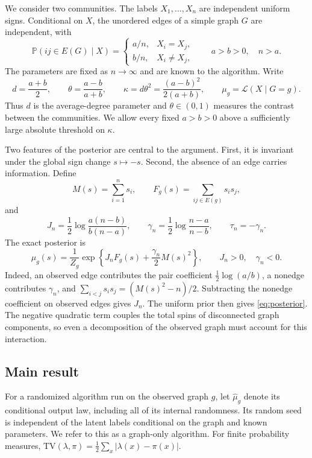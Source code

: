 \documentclass[11pt]{article}
\newcommand{\TV}{\mathrm{TV}}
\def\P{\mathbb{P}}
\numberwithin{equation}{section}
\begin{document}
We consider two communities. The labels $X_1,\ldots,X_n$ are independent uniform signs. Conditional on $X$, the unordered edges of a simple graph $G$ are independent, with
\[
 \P(ij\in E(G)\mid X)=
 \begin{cases}
 a/n,&X_i=X_j,\\
 b/n,&X_i\ne X_j,
 \end{cases}
 \qquad a>b>0,\quad n>a.
\]
The parameters are fixed as $n\to\infty$ and are known to the algorithm. Write
\[
 d=\frac{a+b}{2},\qquad
 \theta=\frac{a-b}{a+b},\qquad
 \kappa=d\theta^2=\frac{(a-b)^2}{2(a+b)},
 \qquad \mu_g=\mathcal L(X\mid G=g).
\]
Thus $d$ is the average-degree parameter and $\theta\in(0,1)$ measures the contrast between the communities. We allow every fixed $a>b>0$ above a sufficiently large absolute threshold on $\kappa$.

Two features of the posterior are central to the argument. First, it is invariant under the global sign change $s\mapsto-s$. Second, the absence of an edge carries information. Define
\[
 M(s)=\sum_{i=1}^n s_i,\qquad
 F_g(s)=\sum_{ij\in E(g)}s_is_j,
\]
and
\[
 J_n=\frac12\log\frac{a(n-b)}{b(n-a)},\qquad
 \gamma_n=\frac12\log\frac{n-a}{n-b},\qquad \tau_n=-\gamma_n.
\]
The exact posterior is
\begin{equation}\label{eq:posterior}
 \mu_g(s)=\frac1{Z_g}
   \exp\left\{J_nF_g(s)+\frac{\gamma_n}{2}M(s)^2\right\},
 \qquad J_n>0,\quad\gamma_n<0.
\end{equation}
Indeed, an observed edge contributes the pair coefficient $\frac12\log(a/b)$, a nonedge contributes $\gamma_n$, and
$\sum_{i<j}s_is_j=(M(s)^2-n)/2$. Subtracting the nonedge coefficient on observed edges gives $J_n$. The uniform prior then gives \eqref{eq:posterior}. The negative quadratic term couples the total spins of disconnected graph components, so even a decomposition of the observed graph must account for this interaction.

\subsection{Main result}

For a randomized algorithm run on the observed graph $g$, let $\widehat\mu_g$ denote its conditional output law, including all of its internal randomness. Its random seed is independent of the latent labels conditional on the graph and known parameters. We refer to this as a graph-only algorithm. For finite probability measures, $\TV(\lambda,\pi)=\frac12\sum_x|\lambda(x)-\pi(x)|$.
\end{document}
